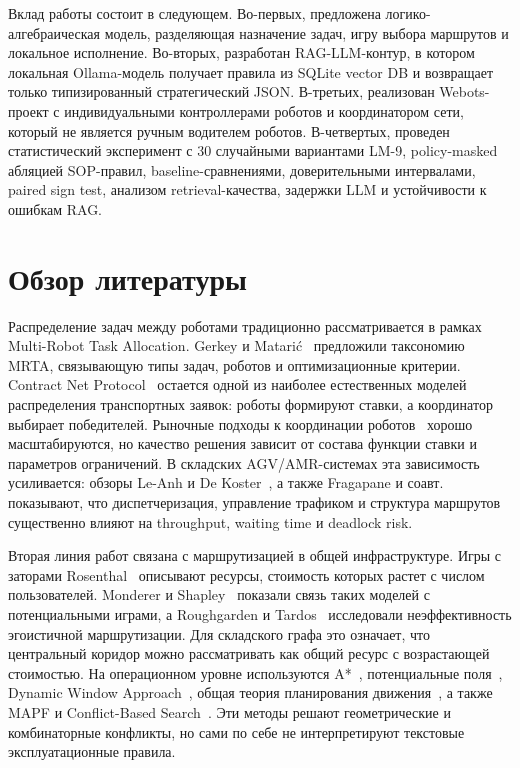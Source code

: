 \documentclass[runningheads]{llncs}
\begin{document}
Вклад работы состоит в следующем. Во-первых, предложена логико-алгебраическая модель, разделяющая назначение задач, игру выбора маршрутов и локальное исполнение. Во-вторых, разработан RAG-LLM-контур, в котором локальная Ollama-модель получает правила из SQLite vector DB и возвращает только типизированный стратегический JSON. В-третьих, реализован Webots-проект с индивидуальными контроллерами роботов и координатором сети, который не является ручным водителем роботов. В-четвертых, проведен статистический эксперимент с 30 случайными вариантами LM-9, policy-masked абляцией SOP-правил, baseline-сравнениями, доверительными интервалами, paired sign test, анализом retrieval-качества, задержки LLM и устойчивости к ошибкам RAG.

\section{Обзор литературы}

Распределение задач между роботами традиционно рассматривается в рамках Multi-Robot Task Allocation. Gerkey и Matari{\'c}~\cite{GerkeyMataric2004MRTA} предложили таксономию MRTA, связывающую типы задач, роботов и оптимизационные критерии. Contract Net Protocol~\cite{Smith1980ContractNet} остается одной из наиболее естественных моделей распределения транспортных заявок: роботы формируют ставки, а координатор выбирает победителей. Рыночные подходы к координации роботов~\cite{Dias2006MarketSurvey,ZlotStentz2006ComplexTasks} хорошо масштабируются, но качество решения зависит от состава функции ставки и параметров ограничений. В складских AGV/AMR-системах эта зависимость усиливается: обзоры Le-Anh и De Koster~\cite{LeAnhDeKoster2006AGV}, а также Fragapane и соавт.~\cite{Fragapane2021AMR} показывают, что диспетчеризация, управление трафиком и структура маршрутов существенно влияют на throughput, waiting time и deadlock risk.

Вторая линия работ связана с маршрутизацией в общей инфраструктуре. Игры с заторами Rosenthal~\cite{Rosenthal1973Congestion} описывают ресурсы, стоимость которых растет с числом пользователей. Monderer и Shapley~\cite{MondererShapley1996Potential} показали связь таких моделей с потенциальными играми, а Roughgarden и Tardos~\cite{RoughgardenTardos2002SelfishRouting} исследовали неэффективность эгоистичной маршрутизации. Для складского графа это означает, что центральный коридор можно рассматривать как общий ресурс с возрастающей стоимостью. На операционном уровне используются A*~\cite{Hart1968AStar}, потенциальные поля~\cite{Khatib1986PotentialFields}, Dynamic Window Approach~\cite{Fox1997DWA}, общая теория планирования движения~\cite{LaValle2006Planning}, а также MAPF и Conflict-Based Search~\cite{YuLaValle2013MAPF,Sharon2015CBS}. Эти методы решают геометрические и комбинаторные конфликты, но сами по себе не интерпретируют текстовые эксплуатационные правила.
\end{document}
